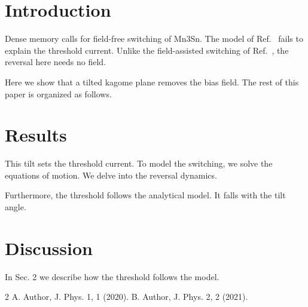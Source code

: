 \documentclass{article}
\begin{document}
\begin{abstract}
Here we show a crucial result for antiferromagnetic memory.
\end{abstract}

\section{Introduction}
Dense memory calls for field-free switching of Mn3Sn.
The model of Ref.~\cite{a} fails to explain the threshold current.
Unlike the field-assisted switching of Ref.~\cite{b}, the reversal here needs no field.

Here we show that a tilted kagome plane removes the bias field.
The rest of this paper is organized as follows.

\section{Results}
This tilt sets the threshold current. To model the switching, we solve the equations of motion.
We delve into the reversal dynamics.

Furthermore, the threshold follows the analytical model. It falls with the tilt angle.

\section{Discussion}
In Sec. 2 we describe how the threshold follows the model.

\begin{thebibliography}{2}
 A. Author, J. Phys. 1, 1 (2020).
 B. Author, J. Phys. 2, 2 (2021).
\end{thebibliography}
\end{document}
